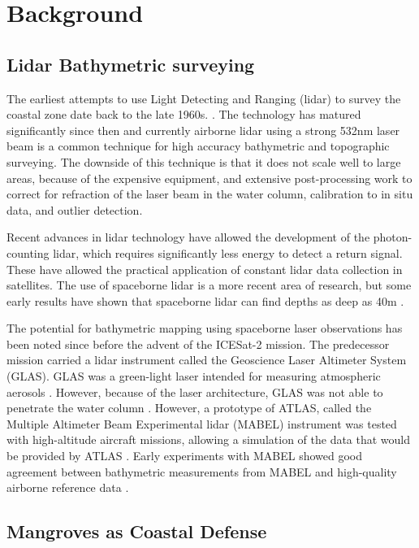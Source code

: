 \chapter{Background}

\section{Lidar Bathymetric surveying}

The earliest attempts to use Light Detecting and Ranging (lidar) to survey the coastal zone date back to the late 1960s. \parencite{Bailly2016}. The technology has matured significantly since then and currently airborne lidar using a strong 532nm laser beam is a common technique for high accuracy bathymetric and topographic surveying. The downside of this technique is that it does not scale well to large areas, because of the expensive equipment, and extensive post-processing work to correct for refraction of the laser beam in the water column, calibration to in situ data, and outlier detection.

Recent advances in lidar technology have allowed the development of the photon-counting lidar, which requires significantly less energy to detect a return signal. These have allowed the practical application of constant lidar data collection in satellites. The use of spaceborne lidar is a more recent area of research, but some early results have shown that spaceborne lidar can find depths as deep as 40m \parencite{Parrish2019}.

The potential for bathymetric mapping using spaceborne laser observations has been noted since before the advent of the ICESat-2 mission. The predecessor mission carried a lidar instrument called the Geoscience Laser Altimeter System (GLAS). GLAS was a green-light laser intended for measuring atmospheric aerosols \parencite{Abshire2005}. However, because of the laser architecture, GLAS was not able to penetrate the water column \parencite{Forfinski-Sarkozi2016}. However, a prototype of ATLAS, called the Multiple Altimeter Beam Experimental lidar (MABEL) instrument was tested with high-altitude aircraft missions, allowing a simulation of the data that would be provided by ATLAS \parencite{Mcgill2013}. Early experiments with MABEL showed good agreement between bathymetric measurements from MABEL and high-quality airborne reference data \parencite{Jasinski2016,Forfinski-Sarkozi2016}.

\section{Mangroves as Coastal Defense}

